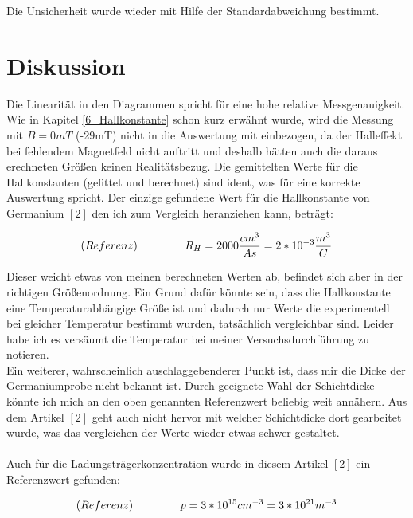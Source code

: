 \documentclass[12pt, a4paper]{article}
\begin{document}
Die Unsicherheit wurde wieder mit Hilfe der Standardabweichung bestimmt.
\section{Diskussion}

Die Linearität in den Diagrammen spricht für eine hohe relative Messgenauigkeit. Wie in Kapitel \ref{6_Hallkonstante} schon kurz erwähnt wurde, wird die Messung mit $B = 0 mT$ (-29mT) nicht in die Auswertung mit einbezogen, da der Halleffekt bei fehlendem Magnetfeld nicht auftritt und deshalb hätten auch die daraus erechneten Größen keinen Realitätsbezug. 
Die gemittelten Werte für die Hallkonstanten (gefittet und berechnet) sind ident, was für eine korrekte Auswertung spricht. Der einzige gefundene Wert für die Hallkonstante von Germanium $[2]$ den ich zum Vergleich heranziehen kann, beträgt:

\begin{equation*}
    (Referenz) \hspace{1.5cm} R_H = 2000 \frac{cm^3}{As} = 2 * 10^{-3} \frac{m^3}{C}
\end{equation*}

Dieser weicht etwas von meinen berechneten Werten ab, befindet sich aber in der richtigen Größenordnung. Ein Grund dafür könnte sein, dass die Hallkonstante eine Temperaturabhängige Größe ist und dadurch nur Werte die experimentell bei gleicher Temperatur bestimmt wurden, tatsächlich vergleichbar sind. Leider habe ich es versäumt die Temperatur bei meiner Versuchsdurchführung zu notieren.\\
Ein weiterer, wahrscheinlich auschlaggebenderer Punkt ist, dass mir die Dicke der Germaniumprobe nicht bekannt ist. Durch geeignete Wahl der Schichtdicke könnte ich mich an den oben genannten Referenzwert beliebig weit annähern. Aus dem Artikel $[2]$ geht auch nicht hervor mit welcher Schichtdicke dort gearbeitet wurde, was das vergleichen der Werte wieder etwas schwer gestaltet. 
\\\\
Auch für die Ladungsträgerkonzentration wurde in diesem Artikel $[2]$ ein Referenzwert gefunden:

\begin{equation*}
    (Referenz) \hspace{1.5cm} p = 3 * 10^{15} cm^{-3} = 3 * 10^{21} m^{-3}
\end{equation*}
\end{document}
